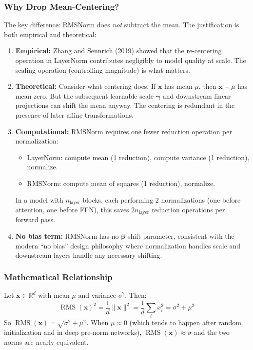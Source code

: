 \documentclass[11pt, a4paper]{article}
\theoremstyle{definition}
\newcommand{\vx}{\bm{x}}
\newcommand{\reals}{\mathbb{R}}
\newcommand{\nlayer}{n_{\text{layer}}}
\DeclareMathOperator{\RMS}{RMS}
\begin{document}
\subsubsection{Why Drop Mean-Centering?}

The key difference: RMSNorm does \emph{not} subtract the mean. The justification is both empirical and theoretical:

\begin{enumerate}
    \item \textbf{Empirical:} Zhang and Sennrich (2019) showed that the re-centering operation in LayerNorm contributes negligibly to model quality at scale. The scaling operation (controlling magnitude) is what matters.
    
    \item \textbf{Theoretical:} Consider what centering does. If $\vx$ has mean $\mu$, then $\vx - \mu$ has mean zero. But the subsequent learnable scale $\bm{\gamma}$ and downstream linear projections can shift the mean anyway. The centering is redundant in the presence of later affine transformations.
    
    \item \textbf{Computational:} RMSNorm requires one fewer reduction operation per normalization:
    \begin{itemize}[nosep]
        \item LayerNorm: compute mean (1 reduction), compute variance (1 reduction), normalize.
        \item RMSNorm: compute mean of squares (1 reduction), normalize.
    \end{itemize}
    In a model with $\nlayer$ blocks, each performing 2 normalizations (one before attention, one before FFN), this saves $2\nlayer$ reduction operations per forward pass.
    
    \item \textbf{No bias term:} RMSNorm has no $\bm{\beta}$ shift parameter, consistent with the modern ``no bias'' design philosophy where normalization handles scale and downstream layers handle any necessary shifting.
\end{enumerate}

\subsubsection{Mathematical Relationship}

Let $\vx \in \reals^d$ with mean $\mu$ and variance $\sigma^2$. Then:
\begin{equation}
    \RMS(\vx)^2 = \frac{1}{d}\|\vx\|^2 = \frac{1}{d}\sum_i x_i^2 = \sigma^2 + \mu^2
\end{equation}
So $\RMS(\vx) = \sqrt{\sigma^2 + \mu^2}$. When $\mu \approx 0$ (which tends to happen after random initialization and in deep pre-norm networks), $\RMS(\vx) \approx \sigma$ and the two norms are nearly equivalent.
\end{document}
